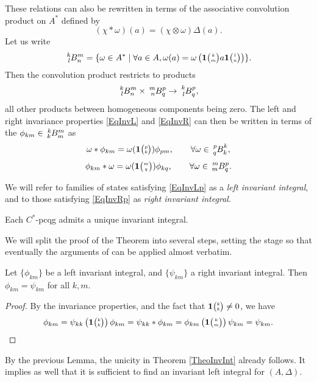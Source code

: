These relations can also  be rewritten in terms of the associative
convolution product on $A^*$  defined by \[(\chi*\omega)(a) =
(\chi\otimes \omega)\Delta(a).\] Let us write \begin{equation}\label{DefSpB} \Gr{B}{k}{m}{l}{n} = \{\omega \in A^* \mid \forall a\in A, \omega(a) = \omega\left(\UnitC{k}{m}a\UnitC{l}{n}\right)\}.\end{equation}Then the convolution product restricts to products \[\Gr{B}{k}{m}{l}{n}\times \Gr{B}{m}{p}{n}{q}\rightarrow \Gr{B}{k}{p}{l}{q},\] all other products between homogeneous components being zero. The left and right invariance properties \eqref{EqInvL} and \eqref{EqInvR} can then be written in terms of the $\phi_{km}\in \Gr{B}{k}{m}{k}{m}$ as \begin{equation}\label{EqInvLp}\omega*\phi_{km} = \omega(\UnitC{p}{k})\phi_{pm},\qquad \forall \omega \in \Gr{B}{p}{k}{q}{k},\end{equation}
\begin{equation}\label{EqInvRp}\phi_{km}*\omega = \omega(\UnitC{m}{q})\phi_{kq},\qquad \forall \omega \in \Gr{B}{m}{p}{m}{q}.\end{equation}


We will refer to families of states satisfying \eqref{EqInvLp} as a \emph{left invariant integral}, and to those satisfying \eqref{EqInvRp} as \emph{right invariant integral}.

\begin{Theorem}\label{TheoInvInt} Each $C^*$-pcqg admits a unique invariant integral.
\end{Theorem} 

We will split the proof of the Theorem into several steps, setting the stage so that eventually the arguments of \cite{MVD1} can be applied almost verbatim. 

\begin{Lem} Let $\{\phi_{km}\}$ be a left invariant integral, and $\{\psi_{km}\}$ a right invariant integral. Then $\phi_{km}= \psi_{km}$ for all $k,m$. 
\end{Lem} 
\begin{proof} By the invariance properties, and the fact that $\mathbf{1}{\tiny {\begin{pmatrix} k\\k\end{pmatrix}}}\neq 0$, we have \[\phi_{km}  = \psi_{kk}\left(\mathbf{1}{\tiny {\begin{pmatrix} k\\k\end{pmatrix}}}\right)\phi_{km} = \psi_{kk}*\phi_{km}= \phi_{km}\left(\mathbf{1}{\tiny {\begin{pmatrix} k\\m\end{pmatrix}}}\right)\psi_{km} = \psi_{km}.\]

\end{proof} 

By the previous Lemma, the unicity in Theorem \ref{TheoInvInt} already follows. It implies as well that it is sufficient to find an invariant left integral for $(A,\Delta)$.

